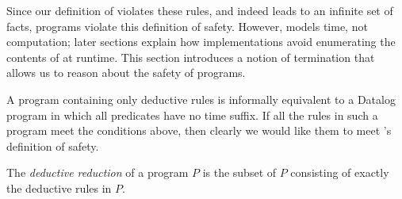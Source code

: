 Since our definition of  violates these rules, and indeed
leads to an infinite set of facts, \slang programs violate this
definition of safety.  However,  models time, not computation;
later sections explain how \lang implementations avoid enumerating the contents
of  at runtime.
This section
introduces a notion of termination that allows us to reason about the safety of
\slang programs.


  



A \slang program containing only deductive rules is informally equivalent to a
Datalog program in which all predicates have no time suffix.  If all the rules
in such a program meet the conditions above, then clearly we would like them to meet \slang's definition of safety. 

\begin{definition} 
%
The \emph{deductive reduction} of a \slang program $P$ is
the subset of $P$ consisting of exactly the deductive rules in $P$.
%
\end{definition}

